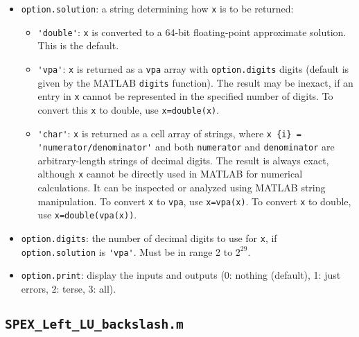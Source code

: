 \documentclass[12pt]{report}
\theoremstyle{definition}
\begin{document}
\begin{itemize}
\item \verb|option.solution|:
    a string determining how \verb|x| is to be returned:

    \begin{itemize}
        \item \verb|'double'|:  \verb|x| is converted to a 64-bit
            floating-point approximate solution.  This is the default.
        \item \verb|'vpa'|:  \verb|x| is returned as a \verb|vpa| array with
            \verb|option.digits| digits (default is given by the MATLAB
            \verb|digits| function).  The result may be inexact, if an entry in
            \verb|x| cannot be represented in the specified number of digits.
            To convert this \verb|x| to double, use \verb|x=double(x)|.
        \item \verb|'char'|:  \verb|x| is returned as a cell array of strings,
            where \verb|x {i} =| \newline \verb|'numerator/denominator'| and both
            \verb|numerator| and \verb|denominator| are arbitrary-length
            strings of decimal digits.  The result is always exact, although
            \verb|x| cannot be directly used in MATLAB for numerical
            calculations.  It can be inspected or analyzed using MATLAB string
            manipulation.  To convert \verb|x| to \verb|vpa|, use
            \verb|x=vpa(x)|.  To convert \verb|x| to double, use
            \verb|x=double(vpa(x))|.
    \end{itemize}

\item \verb|option.digits|: the number of decimal digits to use for \verb|x|, if
        \verb|option.solution| is \verb|'vpa'|.  Must be in range 2 to $2^{29}$.

\item \verb|option.print|: display the inputs and outputs
        (0: nothing (default), 1: just errors, 2: terse, 3: all).

\end{itemize}

\cprotect\subsection{\verb|SPEX_Left_LU_backslash.m|}
\label{s:Use:MATLAB:factor}
\end{document}
